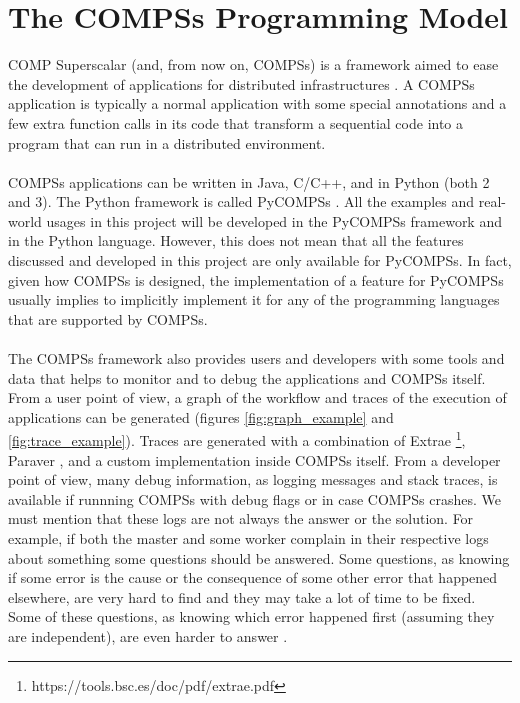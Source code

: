 \section{The COMPSs Programming Model}
\label{sec:compss}
COMP Superscalar (and, from now on, COMPSs) is a framework aimed to ease the development of applications for distributed infrastructures \cite{compss} \cite{Lordan2014}. A COMPSs application is typically a normal application with some special annotations and a few extra function calls in its code that transform a sequential code into a program that can run in a distributed environment.\\
\\
COMPSs applications can be written in Java, C/C++, and in Python (both 2 and 3). The Python framework is called PyCOMPSs \cite{pycompss}. All the examples and real-world usages in this project will be developed in the PyCOMPSs framework and in the Python language. However, this does not mean that all the features discussed and developed in this project are only available for PyCOMPSs. In fact, given how COMPSs is designed, the implementation of a feature for PyCOMPSs usually implies to implicitly implement it for any of the programming languages that are supported by COMPSs.\\
\\
The COMPSs framework also provides users and developers with some tools and data that helps to monitor and to debug the applications and COMPSs itself. From a user point of view, a graph of the workflow and traces of the execution of applications can be generated (figures \ref{fig:graph_example}  and \ref{fig:trace_example}). Traces are generated with a combination of Extrae \footnote{https://tools.bsc.es/doc/pdf/extrae.pdf}, Paraver \cite{paraver}, and a custom implementation inside COMPSs itself. From a developer point of view, many debug information, as logging messages and stack traces, is available if runnning COMPSs with debug flags or in case COMPSs crashes. We must mention that these logs are not always the answer or the solution. For example, if both the master and some worker complain in their respective logs about something some questions should be answered. Some questions, as knowing if some error is the cause or the consequence of some other error that happened elsewhere, are very hard to find and they may take a lot of time to be fixed.  Some of these questions, as knowing which error happened first (assuming they are independent), are even harder to answer \cite{Lamport}. 

